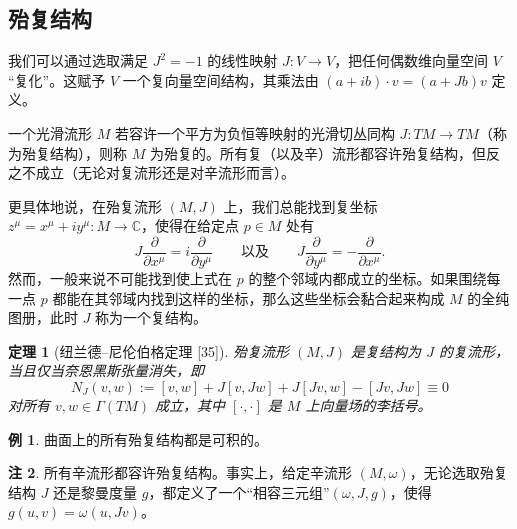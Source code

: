 \documentclass[11pt,a4paper]{article}
\theoremstyle{plain}
\newtheorem{theorem}{定理}[section]
\theoremstyle{definition}
\newtheorem{remark}[theorem]{注}
\newtheorem*{example}{例}
\begin{document}
\subsection{殆复结构}

我们可以通过选取满足 $J^2=-1$ 的线性映射 $J\colon V\to V$，把任何偶数维向量空间 $V$ “复化”。这赋予 $V$ 一个复向量空间结构，其乘法由 $(a+ib)\cdot v=(a+Jb)v$ 定义。

一个光滑流形 $M$ 若容许一个平方为负恒等映射的光滑切丛同构 $J\colon TM\to TM$（称为殆复结构），则称 $M$ 为殆复的。所有复（以及辛）流形都容许殆复结构，但反之不成立（无论对复流形还是对辛流形而言）。

更具体地说，在殆复流形 $(M,J)$ 上，我们总能找到复坐标 $z^\mu=x^\mu+iy^\mu\colon M\to\mathbb{C}$，使得在给定点 $p\in M$ 处有
\[
J\frac{\partial}{\partial x^\mu}=i\frac{\partial}{\partial y^\mu}
\qquad\text{以及}\qquad
J\frac{\partial}{\partial y^\mu}=-\frac{\partial}{\partial x^\mu}.
\]
然而，一般来说不可能找到使上式在 $p$ 的整个邻域内都成立的坐标。如果围绕每一点 $p$ 都能在其邻域内找到这样的坐标，那么这些坐标会黏合起来构成 $M$ 的全纯图册，此时 $J$ 称为一个复结构。

\begin{theorem}[纽兰德–尼伦伯格定理 {[35]}]
殆复流形 $(M,J)$ 是复结构为 $J$ 的复流形，当且仅当奈恩黑斯张量消失，即
\[
N_J(v,w):=[v,w]+J[v,Jw]+J[Jv,w]-[Jv,Jw]\equiv 0
\]
对所有 $v,w\in\Gamma(TM)$ 成立，其中 $[\cdot,\cdot]$ 是 $M$ 上向量场的李括号。
\end{theorem}


\begin{example}
曲面上的所有殆复结构都是可积的。
\end{example}

\begin{remark}
所有辛流形都容许殆复结构。事实上，给定辛流形 $(M,\omega)$，无论选取殆复结构 $J$ 还是黎曼度量 $g$，都定义了一个“相容三元组”$(\omega,J,g)$，使得 $g(u,v)=\omega(u,Jv)$。
\end{remark}

\end{document}
